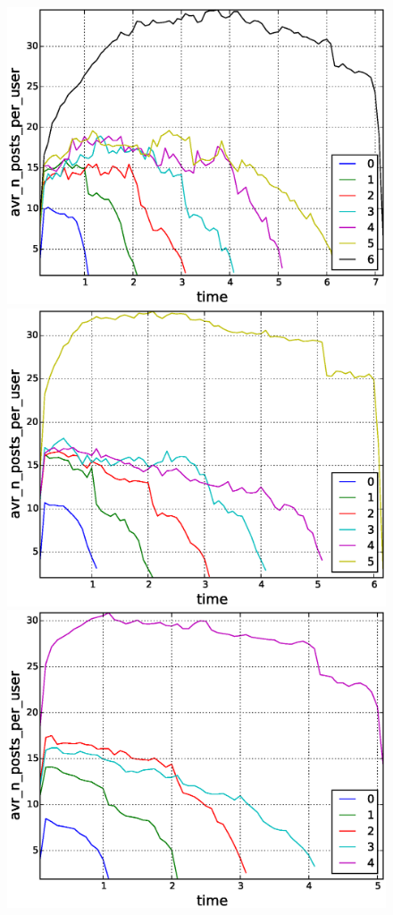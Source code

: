 \begin{figure}[!tb]
\centering
\includegraphics[scale=0.2]{./images/avr_posts_per_user_for_surviving_year_for_2008.eps}
\includegraphics[scale=0.2]{./images/avr_posts_per_user_for_surviving_year_for_2009.eps}
\includegraphics[scale=0.2]{./images/avr_posts_per_user_for_surviving_year_for_2010.eps}

\end{figure}
